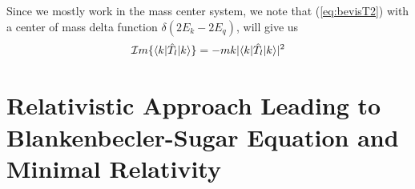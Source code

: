 Since we mostly work in the mass center system, we note that (\ref{eq:bevisT2}) 
with a center of mass delta function
$\delta (2E_k-2E_q)$, will give us
\begin{eqnarray}\label{eq:bevisT246}
{\cal I}m\{\braketm{{ k}}{\op{T}_l}{{ k}}\}=
- m k |\braketm{{   k}}{\op{T}_l}{{ k}}|^2
\end{eqnarray}

















\section[Minimal Relativity]{Relativistic Approach Leading to Blankenbecler-Sugar Equation and Minimal Relativity }


